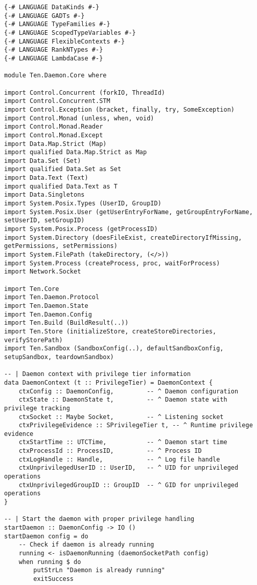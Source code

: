 \documentclass{article}
\begin{document}
\begin{tcolorbox}[title=Ten/Daemon/Core.hs Changes]
\begin{verbatim}
{-# LANGUAGE DataKinds #-}
{-# LANGUAGE GADTs #-}
{-# LANGUAGE TypeFamilies #-}
{-# LANGUAGE ScopedTypeVariables #-}
{-# LANGUAGE FlexibleContexts #-}
{-# LANGUAGE RankNTypes #-}
{-# LANGUAGE LambdaCase #-}

module Ten.Daemon.Core where

import Control.Concurrent (forkIO, ThreadId)
import Control.Concurrent.STM
import Control.Exception (bracket, finally, try, SomeException)
import Control.Monad (unless, when, void)
import Control.Monad.Reader
import Control.Monad.Except
import Data.Map.Strict (Map)
import qualified Data.Map.Strict as Map
import Data.Set (Set)
import qualified Data.Set as Set
import Data.Text (Text)
import qualified Data.Text as T
import Data.Singletons
import System.Posix.Types (UserID, GroupID)
import System.Posix.User (getUserEntryForName, getGroupEntryForName, setUserID, setGroupID)
import System.Posix.Process (getProcessID)
import System.Directory (doesFileExist, createDirectoryIfMissing, getPermissions, setPermissions)
import System.FilePath (takeDirectory, (</>))
import System.Process (createProcess, proc, waitForProcess)
import Network.Socket

import Ten.Core
import Ten.Daemon.Protocol
import Ten.Daemon.State
import Ten.Daemon.Config
import Ten.Build (BuildResult(..))
import Ten.Store (initializeStore, createStoreDirectories, verifyStorePath)
import Ten.Sandbox (SandboxConfig(..), defaultSandboxConfig, setupSandbox, teardownSandbox)

-- | Daemon context with privilege tier information
data DaemonContext (t :: PrivilegeTier) = DaemonContext {
    ctxConfig :: DaemonConfig,         -- ^ Daemon configuration
    ctxState :: DaemonState t,         -- ^ Daemon state with privilege tracking
    ctxSocket :: Maybe Socket,         -- ^ Listening socket
    ctxPrivilegeEvidence :: SPrivilegeTier t, -- ^ Runtime privilege evidence
    ctxStartTime :: UTCTime,           -- ^ Daemon start time
    ctxProcessId :: ProcessID,         -- ^ Process ID
    ctxLogHandle :: Handle,            -- ^ Log file handle
    ctxUnprivilegedUserID :: UserID,   -- ^ UID for unprivileged operations
    ctxUnprivilegedGroupID :: GroupID  -- ^ GID for unprivileged operations
}

-- | Start the daemon with proper privilege handling
startDaemon :: DaemonConfig -> IO ()
startDaemon config = do
    -- Check if daemon is already running
    running <- isDaemonRunning (daemonSocketPath config)
    when running $ do
        putStrLn "Daemon is already running"
        exitSuccess


\end{verbatim}
\end{tcolorbox}
\end{document}
